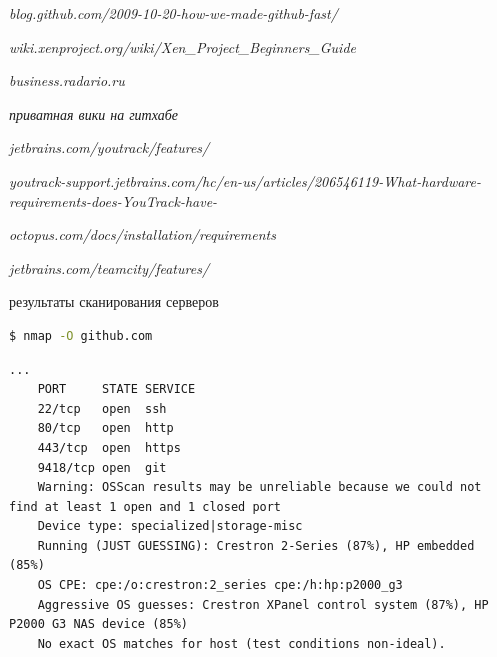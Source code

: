 \documentclass{article}
\begin{document}
\begin{thebibliography}{9}
    \textit{blog.github.com/2009-10-20-how-we-made-github-fast/}
     
    \textit{wiki.xenproject.org/wiki/Xen\_Project\_Beginners\_Guide}
     
    \textit{business.radario.ru}

    \textit{приватная вики на гитхабе}

    \textit{jetbrains.com/youtrack/features/}

    \textit{youtrack-support.jetbrains.com/hc/en-us/articles/206546119-What-hardware-requirements-does-YouTrack-have-}

    \textit{octopus.com/docs/installation/requirements}

    \textit{jetbrains.com/teamcity/features/}

результаты сканирования серверов

\begin{lstlisting}[language=bash, basicstyle=\ttfamily\small]
    $ nmap -O github.com
\end{lstlisting}
\begin{lstlisting}[frame=lines, basicstyle=\ttfamily\small]
    ...
    PORT     STATE SERVICE
    22/tcp   open  ssh
    80/tcp   open  http
    443/tcp  open  https
    9418/tcp open  git
    Warning: OSScan results may be unreliable because we could not find at least 1 open and 1 closed port
    Device type: specialized|storage-misc
    Running (JUST GUESSING): Crestron 2-Series (87%), HP embedded (85%)
    OS CPE: cpe:/o:crestron:2_series cpe:/h:hp:p2000_g3
    Aggressive OS guesses: Crestron XPanel control system (87%), HP P2000 G3 NAS device (85%)
    No exact OS matches for host (test conditions non-ideal).
\end{lstlisting}


\end{thebibliography}
\end{document}
